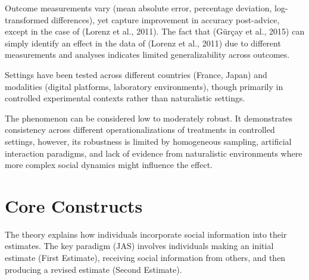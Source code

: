 \documentclass[
  man,floatsintext]{apa6}
\begin{document}
Outcome measurements vary (mean absolute error, percentage deviation, log-transformed differences), yet capture improvement in accuracy post-advice, except in the case of (Lorenz et al., 2011). The fact that (Gürçay et al., 2015) can simply identify an effect in the data of (Lorenz et al., 2011) due to different measurements and analyses indicates limited generalizability across outcomes.

Settings have been tested across different countries (France, Japan) and modalities (digital platforms, laboratory environments), though primarily in controlled experimental contexts rather than naturalistic settings.

The phenomenon can be considered low to moderately robust. It demonstrates consistency across different operationalizations of treatments in controlled settings, however, its robustness is limited by homogeneous sampling, artificial interaction paradigms, and lack of evidence from naturalistic environments where more complex social dynamics might influence the effect.

\hypertarget{core-constructs}{%
\section{Core Constructs}\label{core-constructs}}

The theory explains how individuals incorporate social information into their estimates. The key paradigm (JAS) involves individuals making an initial estimate (First Estimate), receiving social information from others, and then producing a revised estimate (Second Estimate).
\end{document}
